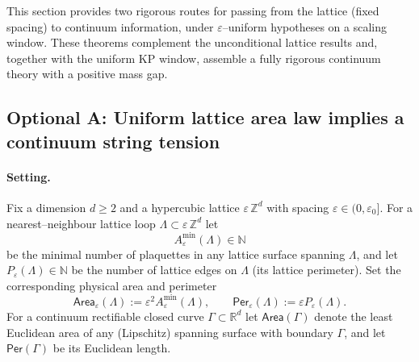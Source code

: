 \documentclass[11pt]{amsart}
\begin{document}
This section provides two rigorous routes for passing from the lattice (fixed spacing) to continuum information, under $\varepsilon$–uniform hypotheses on a scaling window. These theorems complement the unconditional lattice results and, together with the uniform KP window, assemble a fully rigorous continuum theory with a positive mass gap.

\subsection*{Optional A: Uniform lattice area law implies a continuum string tension}

\paragraph{Setting.}
Fix a dimension $d\ge 2$ and a hypercubic lattice $\varepsilon\,\mathbb{Z}^d$ with spacing $\varepsilon\in(0,\varepsilon_0]$. For a nearest--neighbour lattice loop $\Lambda\subset \varepsilon\,\mathbb{Z}^d$ let
\[
  A_\varepsilon^{\min}(\Lambda)\in\mathbb{N}
\]
be the minimal number of plaquettes in any lattice surface spanning $\Lambda$, and let $P_\varepsilon(\Lambda)\in\mathbb{N}$ be the number of lattice edges on $\Lambda$ (its lattice perimeter). Set the corresponding physical area and perimeter
\[
  \mathsf{Area}_\varepsilon(\Lambda):=\varepsilon^2 A_\varepsilon^{\min}(\Lambda),\qquad
  \mathsf{Per}_\varepsilon(\Lambda):=\varepsilon P_\varepsilon(\Lambda).
\]
For a continuum rectifiable closed curve $\Gamma\subset\mathbb{R}^d$ let $\mathsf{Area}(\Gamma)$ denote the least Euclidean area of any (Lipschitz) spanning surface with boundary $\Gamma$, and let $\mathsf{Per}(\Gamma)$ be its Euclidean length.
\end{document}
